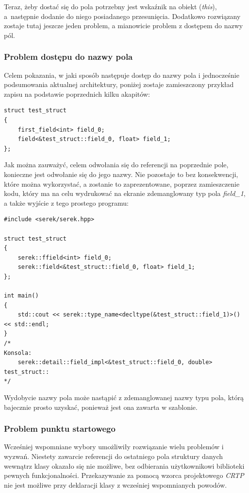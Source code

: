 \documentclass[12pt]{article}
\newcommand{\n}{\newline}
\begin{document}
{{{				Teraz, żeby dostać się do pola potrzebny jest wskaźnik na obiekt ({\it this}), a~następnie dodanie do niego posiadanego przesunięcia.
				Dodatkowo rozwiązany zostaje tutaj jeszcze jeden problem, a mianowicie problem z dostępem do nazwy pól.
			}

			{
				\subsubsection{Problem dostępu do nazwy pola}

				Celem pokazania, w jaki sposób następuje dostęp do nazwy pola i jednocześnie podsumowania aktualnej architektury, poniżej zostaje zamieszczony
				przykład zapisu na podstawie poprzednich kilku akapitów:\n

				\begin{lstlisting}[frame=single]
struct test_struct
{
	first_field<int> field_0;
	field<&test_struct::field_0, float> field_1;
};
				\end{lstlisting}

				Jak można zauważyć, celem odwołania się do referencji na poprzednie pole, konieczne jest odwołanie się do jego nazwy. Nie pozostaje to bez
				konsekwencji, które można wykorzystać, a zostanie to zaprezentowane, poprzez zamieszczenie kodu, który ma na celu wydrukować na ekranie
				zdemanglowany typ pola {\it field\_1}, a także wyjście z tego prostego programu:\n

				\begin{lstlisting}[frame=single]
#include <serek/serek.hpp>

struct test_struct
{
	serek::ffield<int> field_0;
	serek::field<&test_struct::field_0, float> field_1;
};

int main()
{
	std::cout << serek::type_name<decltype(&test_struct::field_1)>() << std::endl;
}
/*
Konsola:
	serek::detail::field_impl<&test_struct::field_0, double> test_struct::
*/
				\end{lstlisting}

				Wydobycie nazwy pola może nastąpić z zdemanglowanej nazwy typu pola, którą bajecznie prosto uzyskać, ponieważ jest ona zawarta
				w szablonie.
			}

			{
				\subsubsection{Problem punktu startowego}

				Wcześniej wspomniane wybory umożliwiły rozwiązanie wielu problemów i wyzwań. Niestety zawarcie referencji do ostatniego pola
				struktury danych wewnątrz klasy okazało się nie możliwe, bez odbierania użytkownikowi biblioteki pewnych funkcjonalności.
				Przekazywanie za pomocą wzorca projektowego {\it CRTP} nie jest możliwe przy deklaracji klasy z wcześniej wspomnianych powodów.\n

}}}
\end{document}
